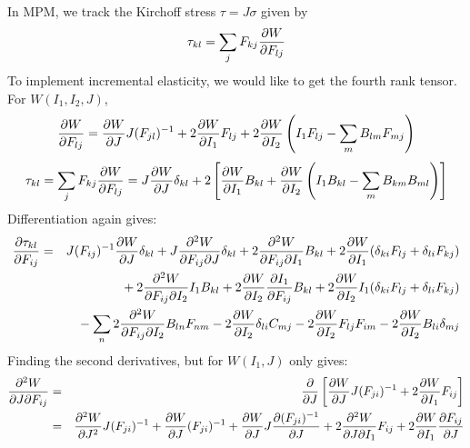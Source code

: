 \documentclass[11pt]{book}
\newcommand{\tens}[1]{\boldsymbol{\mathsf{#1}}}
\begin{document}
In MPM, we track the Kirchoff stress $\tens\tau = J\tens\sigma$ given by
\begin{equation}
     \tau_{kl} =  \sum_j F_{kj}{\partial W\over \partial F_{lj}}
\end{equation}
To implement incremental elasticity, we would like to get the fourth rank tensor.
For $W(I_1,I_2,J)$,
\begin{equation}
    {\partial W\over \partial F_{lj}} = {\partial W\over \partial J}J (F_{jl})^{-1}
          + 2{\partial W\over \partial I_1}F_{lj}
          + 2{\partial W\over \partial I_2}\left(I_1F_{lj}-\sum_m B_{lm}F_{mj}\right)
\end{equation}
\begin{equation}
        \tau_{kl} = \sum_j F_{kj}{\partial W\over \partial F_{lj}} = J{\partial W\over \partial J}\delta_{kl}
         + 2\left[ {\partial W\over \partial I_1}B_{kl}
          + {\partial W\over \partial I_2}\left(I_1B_{kl} - \sum_m B_{km}B_{ml}\right)
                                            \right]
\end{equation}
Differentiation again gives:
\begin{eqnarray}
{\partial\tau_{kl}\over\partial F_{ij}} & = & J(F_{ij})^{-1}{\partial W\over \partial J}\delta_{kl}
        + J{\partial^2 W\over \partial F_{ij}\partial J}\delta_{kl}
        + 2{\partial^2 W\over \partial F_{ij}\partial I_1}B_{kl} 
        + 2{\partial W\over \partial I_1}(\delta_{ki}F_{lj} + \delta_{li}F_{kj})
    \nonumber\\
    &&\mbox{}
         + 2{\partial^2 W\over \partial F_{ij}\partial I_2}I_1B_{kl}
         + 2{\partial W\over \partial I_2}{\partial I_1\over \partial F_{ij}}B_{kl}
         + 2{\partial W\over \partial I_2}I_1(\delta_{ki}F_{lj} + \delta_{li}F_{kj})
    \nonumber\\
    &&\mbox{}
         -\sum_n 2{\partial^2 W\over \partial F_{ij}\partial I_2} B_{ln}F_{nm}
         - 2{\partial W\over \partial I_2}\delta_{li}C_{mj}
          -2{\partial W\over \partial I_2}F_{lj}F_{im}
        - 2{\partial W\over \partial I_2} B_{li}\delta_{mj}
\end{eqnarray}
Finding the second derivatives, but for $W(I_1,J)$ only gives:
\begin{eqnarray}
   {\partial^2 W\over \partial J\partial F_{ij}} & = & {\partial\over\partial J}
          \left[{\partial W\over \partial J}J (F_{ji})^{-1}
          + 2{\partial W\over \partial I_1}F_{ij}\right] \\
    & = & {\partial^2W\over \partial J^2}J (F_{ji})^{-1} + {\partial W\over \partial J}(F_{ji})^{-1}
 + {\partial W\over \partial J}J {\partial (F_{ji})^{-1}\over \partial J}
 + 2{\partial^2 W\over \partial J \partial I_1}F_{ij} + 2{\partial W\over \partial I_1}{\partial F_{ij}\over\partial J}
\end{eqnarray}
\end{document}
